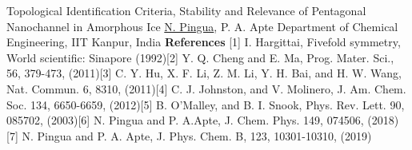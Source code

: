 \begin{abstract_online}{Topological Identification Criteria, Stability and Relevance of Pentagonal Nanochannel in Amorphous Ice }{%
        \underline{N. Pingua}, P. A. Apte}{%
        }{%
        Department of Chemical Engineering, IIT Kanpur, India}
        \textbf{References} \newline{}[1] I. Hargittai, Fivefold symmetry, World scientific: Sinapore (1992)\newline{}[2] Y. Q. Cheng and E. Ma, Prog. Mater. Sci., 56, 379-473, (2011)\newline{}[3] C. Y. Hu, X. F. Li, Z. M. Li, Y. H. Bai, and H. W. Wang, Nat. Commun. 6, 8310, (2011)\newline{}[4] C. J. Johnston, and V. Molinero, J. Am. Chem. Soc. 134, 6650-6659, (2012)\newline{}[5] B. O’Malley, and B. I. Snook, Phys. Rev. Lett. 90, 085702, (2003)\newline{}[6] N. Pingua and P. A.Apte, J. Chem. Phys. 149, 074506, (2018)\newline{}[7] N. Pingua and P. A. Apte, J. Phys. Chem. B, 123, 10301-10310, (2019) 
    \end{abstract_online}
    